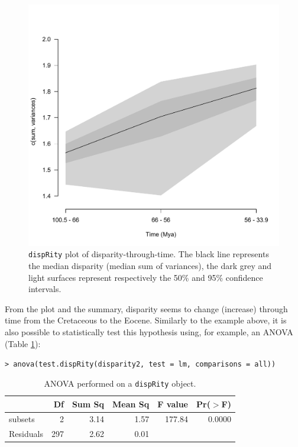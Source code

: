 \documentclass[12pt,letterpaper]{article}
\newcommand{\disp}{\texttt{dispRity} }
\begin{document}
\begin{figure}[!htbp]
\centering
   \includegraphics[width=1\textwidth]{plot_example_time.pdf} 
\caption{\disp plot of disparity-through-time. The black line represents the median disparity (median sum of variances), the dark grey and light surfaces represent respectively the 50\% and 95\% confidence intervals.}
\label{Fig:plot_time}
\end{figure}

From the plot and the summary, disparity seems to change (increase) through time from the Cretaceous to the Eocene.
Similarly to the example above, it is also possible to statistically test this hypothesis using, for example, an ANOVA (Table \ref{Tab:anova}): 

\noindent \texttt{> anova(test.dispRity(disparity2, test = lm, comparisons = \textquotedbl all\textquotedbl))}

\begin{table}[ht]
\centering
\begin{tabular}{lrrrrr}
  \hline
 & Df & Sum Sq & Mean Sq & F value & Pr($>$F) \\ 
  \hline
subsets & 2 & 3.14 & 1.57 & 177.84 & 0.0000 \\ 
  Residuals & 297 & 2.62 & 0.01 &  &  \\ 
   \hline
\end{tabular}
\caption{ANOVA performed on a \disp object.}
\label{Tab:anova}
\end{table}
\end{document}
